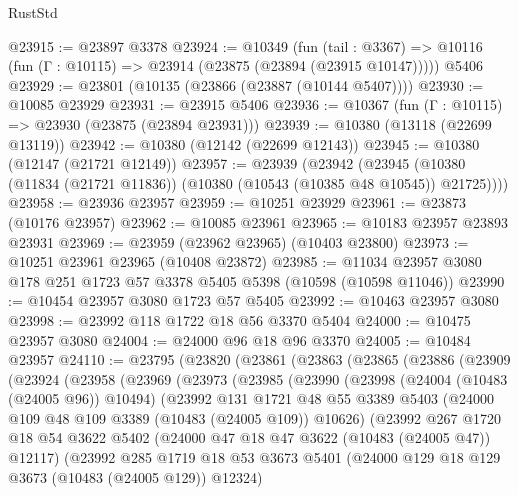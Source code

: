 \begin{lexlean}{RustStd}
\begin{coremodule}
@23915 := @23897 @3378
@23924 := @10349
    (fun (tail : @3367) => @10116 (fun (Γ : @10115) => @23914 (@23875 (@23894 (@23915 @10147)))))
    @5406
@23929 := @23801 (@10135 (@23866 (@23887 (@10144 @5407))))
@23930 := @10085 @23929
@23931 := @23915 @5406
@23936 := @10367 (fun (Γ : @10115) => @23930 (@23875 (@23894 @23931)))
@23939 := @10380 (@13118 (@22699 @13119))
@23942 := @10380 (@12142 (@22699 @12143))
@23945 := @10380 (@12147 (@21721 @12149))
@23957 := @23939
    (@23942 (@23945 (@10380 (@11834 (@21721 @11836)) (@10380 (@10543 (@10385 @48 @10545)) @21725))))
@23958 := @23936 @23957
@23959 := @10251 @23929
@23961 := @23873 (@10176 @23957)
@23962 := @10085 @23961
@23965 := @10183 @23957 @23893 @23931
@23969 := @23959 (@23962 @23965) (@10403 @23800)
@23973 := @10251 @23961 @23965 (@10408 @23872)
@23985 := @11034 @23957 @3080 @178 @251 @1723 @57 @3378 @5405 @5398 (@10598 (@10598 @11046))
@23990 := @10454 @23957 @3080 @1723 @57 @5405
@23992 := @10463 @23957 @3080
@23998 := @23992 @118 @1722 @18 @56 @3370 @5404
@24000 := @10475 @23957 @3080
@24004 := @24000 @96 @18 @96 @3370
@24005 := @10484 @23957
@24110 := @23795
    (@23820
      (@23861
        (@23863
          (@23865
            (@23886
              (@23909
                (@23924
                  (@23958
                    (@23969
                      (@23973
                        (@23985
                          (@23990
                            (@23998
                              (@24004 (@10483 (@24005 @96)) @10494)
                              (@23992
                                @131
                                @1721
                                @48
                                @55
                                @3389
                                @5403
                                (@24000 @109 @48 @109 @3389 (@10483 (@24005 @109)) @10626)
                                (@23992
                                  @267
                                  @1720
                                  @18
                                  @54
                                  @3622
                                  @5402
                                  (@24000 @47 @18 @47 @3622 (@10483 (@24005 @47)) @12117)
                                  (@23992
                                    @285
                                    @1719
                                    @18
                                    @53
                                    @3673
                                    @5401
                                    (@24000 @129 @18 @129 @3673 (@10483 (@24005 @129)) @12324)

\end{coremodule}
\end{lexlean}
